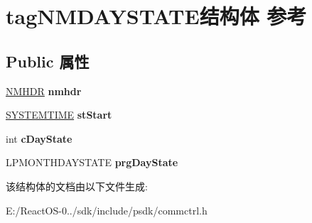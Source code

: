 \hypertarget{structtag_n_m_d_a_y_s_t_a_t_e}{}\section{tag\+N\+M\+D\+A\+Y\+S\+T\+A\+T\+E结构体 参考}
\label{structtag_n_m_d_a_y_s_t_a_t_e}
\subsection*{Public 属性}
\begin{DoxyCompactItemize}
\item 
\mbox{\label{structtag_n_m_d_a_y_s_t_a_t_e_a2fb918ecdac2ccda6f28745b2b49557d}} 
\hyperlink{structtag_n_m_h_d_r}{N\+M\+H\+DR} {\bfseries nmhdr}
\item 
\mbox{\label{structtag_n_m_d_a_y_s_t_a_t_e_abb3dd8de1ac0c9ecb0ccab25eca4699a}} 
\hyperlink{struct___s_y_s_t_e_m_t_i_m_e}{S\+Y\+S\+T\+E\+M\+T\+I\+ME} {\bfseries st\+Start}
\item 
\mbox{\label{structtag_n_m_d_a_y_s_t_a_t_e_a3ff23c05c0308ef0d1094a27572a321f}} 
int {\bfseries c\+Day\+State}
\item 
\mbox{\label{structtag_n_m_d_a_y_s_t_a_t_e_ab2d9d3e68532995179af6fb2d98f98ce}} 
L\+P\+M\+O\+N\+T\+H\+D\+A\+Y\+S\+T\+A\+TE {\bfseries prg\+Day\+State}
\end{DoxyCompactItemize}


该结构体的文档由以下文件生成\+:\begin{DoxyCompactItemize}
\item 
E\+:/\+React\+O\+S-\/0../sdk/include/psdk/commctrl.\+h\end{DoxyCompactItemize}
